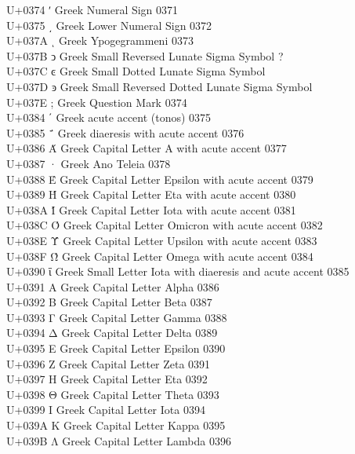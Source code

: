 \documentclass[UTF8,nofonts]{ctexart}
\begin{document}
U+0374  ʹ Greek Numeral Sign  0371\\
U+0375  ͵ Greek Lower Numeral Sign  0372\\
U+037A  ͺ Greek Ypogegrammeni 0373\\
U+037B  ͻ Greek Small Reversed Lunate Sigma Symbol  ?\\
U+037C  ͼ Greek Small Dotted Lunate Sigma Symbol\\
U+037D  ͽ Greek Small Reversed Dotted Lunate Sigma Symbol\\
U+037E  ; Greek Question Mark 0374\\
U+0384  ΄ Greek acute accent (tonos)  0375\\
U+0385  ΅ Greek diaeresis with acute accent 0376\\
U+0386  Ά Greek Capital Letter A with acute accent  0377\\
U+0387  · Greek Ano Teleia  0378\\
U+0388  Έ Greek Capital Letter Epsilon with acute accent  0379\\
U+0389  Ή Greek Capital Letter Eta with acute accent  0380\\
U+038A  Ί Greek Capital Letter Iota with acute accent 0381\\
U+038C  Ό Greek Capital Letter Omicron with acute accent  0382\\
U+038E  Ύ Greek Capital Letter Upsilon with acute accent  0383\\
U+038F  Ώ Greek Capital Letter Omega with acute accent  0384\\
U+0390  ΐ Greek Small Letter Iota with diaeresis and acute accent 0385\\
U+0391  Α Greek Capital Letter Alpha  0386\\
U+0392  Β Greek Capital Letter Beta 0387\\
U+0393  Γ Greek Capital Letter Gamma  0388\\
U+0394  Δ Greek Capital Letter Delta  0389\\
U+0395  Ε Greek Capital Letter Epsilon  0390\\
U+0396  Ζ Greek Capital Letter Zeta 0391\\
U+0397  Η Greek Capital Letter Eta  0392\\
U+0398  Θ Greek Capital Letter Theta  0393\\
U+0399  Ι Greek Capital Letter Iota 0394\\
U+039A  Κ Greek Capital Letter Kappa  0395\\
U+039B  Λ Greek Capital Letter Lambda 0396\\
\end{document}
